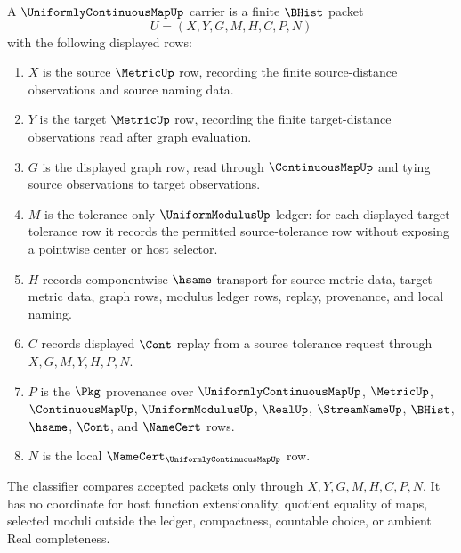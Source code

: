 \begin{definition}
\label{def:uniformly-continuous-map-carrier}
A $\UniformlyContinuousMapUp$ carrier is a finite $\BHist$ packet
$$
U=(X,Y,G,M,H,C,P,N)
$$
with the following displayed rows:
\begin{enumerate}
\item $X$ is the source $\MetricUp$ row, recording the finite source-distance observations and source naming data.
\item $Y$ is the target $\MetricUp$ row, recording the finite target-distance observations read after graph evaluation.
\item $G$ is the displayed graph row, read through $\ContinuousMapUp$ and tying source observations to target observations.
\item $M$ is the tolerance-only $\UniformModulusUp$ ledger: for each displayed target tolerance row it records the permitted source-tolerance row without exposing a pointwise center or host selector.
\item $H$ records componentwise $\hsame$ transport for source metric data, target metric data, graph rows, modulus ledger rows, replay, provenance, and local naming.
\item $C$ records displayed $\Cont$ replay from a source tolerance request through $X,G,M,Y,H,P,N$.
\item $P$ is the $\Pkg$ provenance over $\UniformlyContinuousMapUp$, $\MetricUp$, $\ContinuousMapUp$, $\UniformModulusUp$, $\RealUp$, $\StreamNameUp$, $\BHist$, $\hsame$, $\Cont$, and $\NameCert$ rows.
\item $N$ is the local $\NameCert_{\UniformlyContinuousMapUp}$ row.
\end{enumerate}
The classifier compares accepted packets only through $X,Y,G,M,H,C,P,N$. It has no coordinate for host function extensionality, quotient equality of maps, selected moduli outside the ledger, compactness, countable choice, or ambient Real completeness.
\end{definition}

